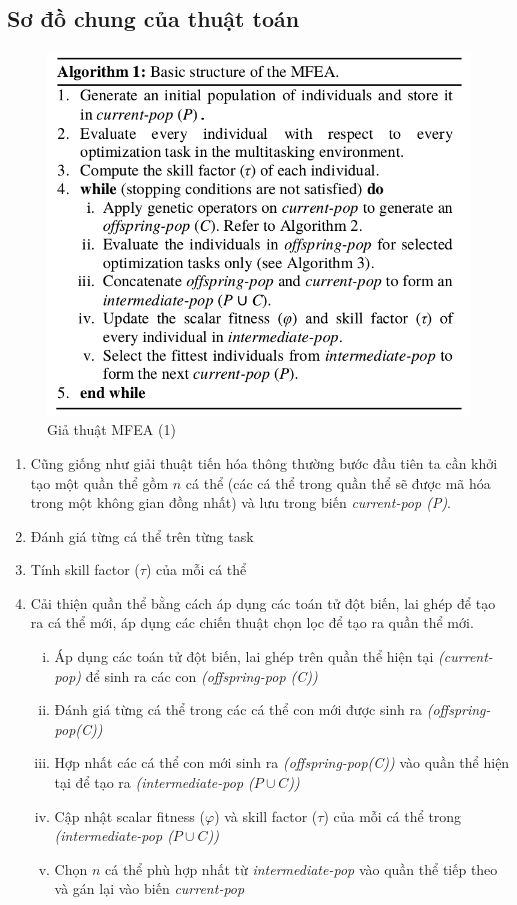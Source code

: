 \documentclass[a4paper,12pt]{report}
\begin{document}
\subsection{Sơ đồ chung của thuật toán}
\begin{figure}[H]
\centering 
\includegraphics[scale=0.8]{al1.png}
\caption{Giả thuật MFEA (1)}
\end{figure}
\begin{enumerate}
\item Cũng giống như giải thuật tiến hóa thông thường bước đầu tiên ta cần khởi tạo một quần thể gồm $n$ cá thể (các cá thể trong quần thể sẽ được mã hóa trong một không gian đồng nhất) và lưu trong biến \emph{current-pop (P)}.
\item Đánh giá từng cá thể trên từng task 
\item Tính skill factor ($\tau$) của mỗi cá thể
\item Cải thiện quần thể bằng cách áp dụng các toán tử đột biến, lai ghép để tạo ra cá thể mới, áp dụng các chiến thuật chọn lọc để tạo ra quần thể mới. 
\begin{enumerate}[i.]
\item Áp dụng các toán tử đột biến, lai ghép trên quần thể hiện tại  \emph{(current-pop)} để sinh ra các con \emph{(offspring-pop (C))}
\item Đánh giá từng cá thể trong các cá thể con mới được sinh ra \emph{(offspring-pop(C))} 
\item Hợp nhất các cá thể con mới sinh ra \emph{(offspring-pop(C))} vào quần thể hiện tại để tạo ra \emph{(intermediate-pop ($P \cup C$))} 
\item Cập nhật scalar fitness ($\varphi$) và skill factor ($\tau$) của mỗi cá thể trong \emph{(intermediate-pop ($P \cup C$))}
\item Chọn $n$ cá thể phù hợp nhất từ \emph{intermediate-pop} vào quần thể tiếp theo và gán lại vào biến \emph{current-pop}
\end{enumerate}
\end{enumerate} 
\end{document}
